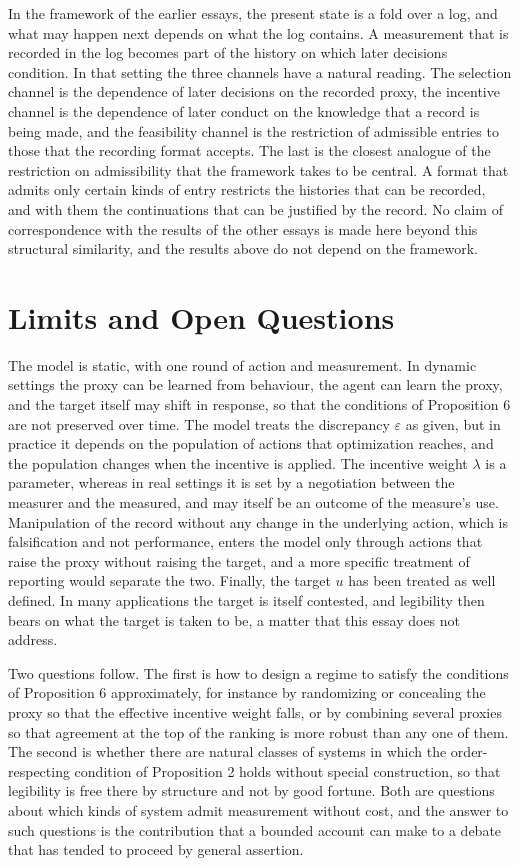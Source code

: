 \documentclass[11pt]{article}
\theoremstyle{remark}
\begin{document}
In the framework of the earlier essays, the present state is a fold over a log, and what may happen next depends on what the log contains. A measurement that is recorded in the log becomes part of the history on which later decisions condition. In that setting the three channels have a natural reading. The selection channel is the dependence of later decisions on the recorded proxy, the incentive channel is the dependence of later conduct on the knowledge that a record is being made, and the feasibility channel is the restriction of admissible entries to those that the recording format accepts. The last is the closest analogue of the restriction on admissibility that the framework takes to be central. A format that admits only certain kinds of entry restricts the histories that can be recorded, and with them the continuations that can be justified by the record. No claim of correspondence with the results of the other essays is made here beyond this structural similarity, and the results above do not depend on the framework.

\section{Limits and Open Questions}

The model is static, with one round of action and measurement. In dynamic settings the proxy can be learned from behaviour, the agent can learn the proxy, and the target itself may shift in response, so that the conditions of Proposition 6 are not preserved over time. The model treats the discrepancy $\varepsilon$ as given, but in practice it depends on the population of actions that optimization reaches, and the population changes when the incentive is applied. The incentive weight $\lambda$ is a parameter, whereas in real settings it is set by a negotiation between the measurer and the measured, and may itself be an outcome of the measure's use. Manipulation of the record without any change in the underlying action, which is falsification and not performance, enters the model only through actions that raise the proxy without raising the target, and a more specific treatment of reporting would separate the two. Finally, the target $u$ has been treated as well defined. In many applications the target is itself contested, and legibility then bears on what the target is taken to be, a matter that this essay does not address.

Two questions follow. The first is how to design a regime to satisfy the conditions of Proposition 6 approximately, for instance by randomizing or concealing the proxy so that the effective incentive weight falls, or by combining several proxies so that agreement at the top of the ranking is more robust than any one of them. The second is whether there are natural classes of systems in which the order-respecting condition of Proposition 2 holds without special construction, so that legibility is free there by structure and not by good fortune. Both are questions about which kinds of system admit measurement without cost, and the answer to such questions is the contribution that a bounded account can make to a debate that has tended to proceed by general assertion.
\end{document}
